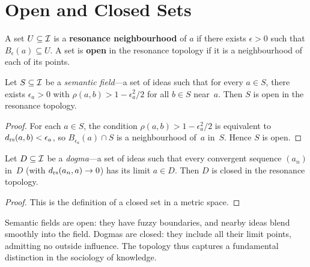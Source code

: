 \section{Open and Closed Sets}
\label{sec:open-closed}

\begin{definition}
\label{def:neighbourhood}
A set $U \subseteq \mathcal{I}$ is a \textbf{resonance neighbourhood}
of $a$ if there exists $\epsilon > 0$ such that $B_\epsilon(a)
\subseteq U$.  A set is \textbf{open} in the resonance topology
if it is a neighbourhood of each of its points.
\end{definition}

\begin{proposition}
\label{prop:semantic-open}
Let $S \subseteq \mathcal{I}$ be a \emph{semantic field}---a set of
ideas such that for every $a \in S$, there exists $\epsilon_a > 0$
with $\rho(a,b) > 1 - \epsilon_a^2/2$ for all $b \in S$ near~$a$.
Then $S$ is open in the resonance topology.
\end{proposition}

\begin{proof}
For each $a \in S$, the condition $\rho(a,b) > 1-\epsilon_a^2/2$
is equivalent to $d_{\mathrm{rs}}(a,b) < \epsilon_a$, so
$B_{\epsilon_a}(a) \cap S$ is a neighbourhood of~$a$ in~$S$.
Hence $S$ is open.
\end{proof}

\begin{proposition}
\label{prop:dogma-closed}
Let $D \subseteq \mathcal{I}$ be a \emph{dogma}---a set of ideas
such that every convergent sequence $(a_n)$ in~$D$ (with
$d_{\mathrm{rs}}(a_n, a) \to 0$) has its limit $a \in D$.  Then $D$
is closed in the resonance topology.
\end{proposition}

\begin{proof}
This is the definition of a closed set in a metric space.
\end{proof}

\begin{interpretation}
Semantic fields are open: they have fuzzy boundaries, and nearby
ideas blend smoothly into the field.  Dogmas are closed: they
include all their limit points, admitting no outside influence.
The topology thus captures a fundamental distinction in the
sociology of knowledge.
\end{interpretation}

